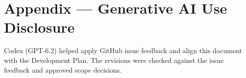 \documentclass{article}
\begin{document}
\section*{Appendix --- Generative AI Use Disclosure}

Codex (GPT-6.2) helped apply GitHub issue feedback and align this document
with the Development Plan. The revisions were checked against the issue
feedback and approved scope decisions.



\end{document}
